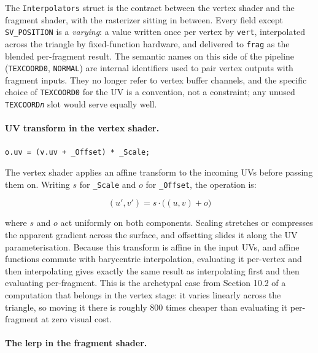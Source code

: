 \documentclass[11pt]{article}
\begin{document}
The \texttt{Interpolators} struct is the contract between the vertex shader and the fragment shader, with the rasterizer sitting in between. Every field except \texttt{SV\_POSITION} is a \emph{varying}: a value written once per vertex by \texttt{vert}, interpolated across the triangle by fixed-function hardware, and delivered to \texttt{frag} as the blended per-fragment result. The semantic names on this side of the pipeline (\texttt{TEXCOORD0}, \texttt{NORMAL}) are internal identifiers used to pair vertex outputs with fragment inputs. They no longer refer to vertex buffer channels, and the specific choice of \texttt{TEXCOORD0} for the UV is a convention, not a constraint; any unused \texttt{TEXCOORD\textit{n}} slot would serve equally well.

\paragraph{UV transform in the vertex shader.}

\begin{lstlisting}
o.uv = (v.uv + _Offset) * _Scale;
\end{lstlisting}

The vertex shader applies an affine transform to the incoming UVs before passing them on. Writing $s$ for \texttt{\_Scale} and $o$ for \texttt{\_Offset}, the operation is:

\begin{equation}
    (u', v') = s \cdot \bigl( (u, v) + o \bigr)
\end{equation}

where $s$ and $o$ act uniformly on both components. Scaling stretches or compresses the apparent gradient across the surface, and offsetting slides it along the UV parameterisation. Because this transform is affine in the input UVs, and affine functions commute with barycentric interpolation, evaluating it per-vertex and then interpolating gives exactly the same result as interpolating first and then evaluating per-fragment. This is the archetypal case from Section 10.2 of a computation that belongs in the vertex stage: it varies linearly across the triangle, so moving it there is roughly $800$ times cheaper than evaluating it per-fragment at zero visual cost.

\paragraph{The lerp in the fragment shader.}
\end{document}
